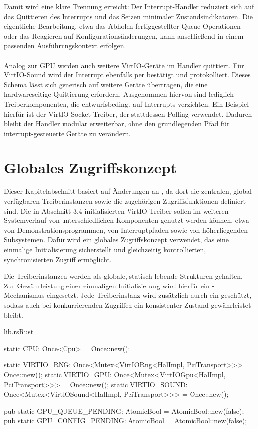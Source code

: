 Damit wird eine klare Trennung erreicht: Der Interrupt-Handler reduziert sich auf das Quittieren des Interrupts und das Setzen minimaler Zustandsindikatoren. Die eigentliche Bearbeitung, etwa das Abholen fertiggestellter Queue-Operationen oder das Reagieren auf Konfigurationsänderungen, kann anschließend in einem passenden Ausführungskontext erfolgen.\\
\\
Analog zur GPU werden auch weitere VirtIO-Geräte im Handler quittiert. Für VirtIO-Sound wird der Interrupt ebenfalls per  bestätigt und protokolliert. Dieses Schema lässt sich generisch auf weitere Geräte übertragen, die eine hardwareseitige Quittierung erfordern. Ausgenommen hiervon sind lediglich Treiberkomponenten, die entwurfsbedingt auf Interrupts verzichten. Ein Beispiel hierfür ist der VirtIO-Socket-Treiber, der stattdessen Polling verwendet. Dadurch bleibt der Handler modular erweiterbar, ohne den grundlegenden Pfad für interrupt-gesteuerte Geräte zu verändern.

\section{Globales Zugriffskonzept}

Dieser Kapitelabschnitt basiert auf Änderungen an , da dort die zentralen, global verfügbaren Treiberinstanzen sowie die zugehörigen Zugriffsfunktionen definiert sind. Die in Abschnitt 3.4 initialisierten VirtIO-Treiber sollen im weiteren Systemverlauf von unterschiedlichen Komponenten genutzt werden können, etwa von Demonstrationsprogrammen, von Interruptpfaden sowie von höherliegenden Subsystemen. Dafür wird ein globales Zugriffskonzept verwendet, das eine einmalige Initialisierung sicherstellt und gleichzeitig kontrollierten, synchronisierten Zugriff ermöglicht.

Die Treiberinstanzen werden als globale, statisch lebende Strukturen gehalten. Zur Gewährleistung einer einmaligen Initialisierung wird hierfür ein -Mechanismus eingesetzt. Jede Treiberinstanz wird zusätzlich durch ein  geschützt, sodass auch bei konkurrierenden Zugriffen ein konsistenter Zustand gewährleistet bleibt.

\begin{codeblock}{lib.rs}{Rust}
  \begin{rustcode}
static CPU: Once<Cpu> = Once::new();

static VIRTIO_RNG:   Once<Mutex<VirtIORng<HalImpl, PciTransport>>>   = Once::new();
static VIRTIO_GPU:   Once<Mutex<VirtIOGpu<HalImpl, PciTransport>>>   = Once::new();
static VIRTIO_SOUND: Once<Mutex<VirtIOSound<HalImpl, PciTransport>>> = Once::new();

pub static GPU_QUEUE_PENDING:  AtomicBool = AtomicBool::new(false);
pub static GPU_CONFIG_PENDING: AtomicBool = AtomicBool::new(false);
  \end{rustcode}
\end{codeblock}

